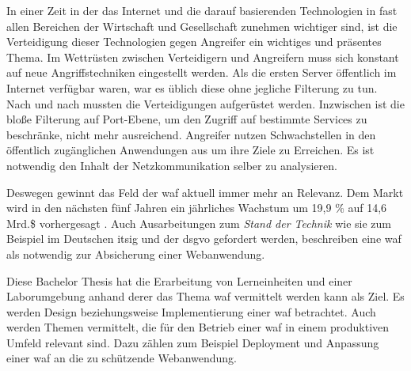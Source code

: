 \label{sec:introuduction}

In einer Zeit in der das Internet und die darauf basierenden Technologien in fast allen Bereichen der Wirtschaft und Gesellschaft zunehmen wichtiger sind, ist die Verteidigung dieser Technologien gegen Angreifer ein wichtiges und präsentes Thema.
Im Wettrüsten zwischen Verteidigern und Angreifern muss sich konstant auf neue Angriffstechniken eingestellt werden.
Als die ersten Server öffentlich im Internet verfügbar waren, war es üblich diese ohne jegliche Filterung zu tun.
Nach und nach mussten die Verteidigungen aufgerüstet werden.
Inzwischen ist die bloße Filterung auf Port-Ebene, um den Zugriff auf bestimmte Services zu beschränke, nicht mehr ausreichend.
Angreifer nutzen Schwachstellen in den öffentlich zugänglichen Anwendungen aus um ihre Ziele zu Erreichen.
Es ist notwendig den Inhalt der Netzkommunikation selber zu analysieren.


Deswegen gewinnt das Feld der \ac{waf} aktuell immer mehr an Relevanz.
Dem Markt wird in den nächsten fünf Jahren ein jährliches Wachstum um 19,9 \% auf 14,6 Mrd.\$ vorhergesagt \cite{WebApplicationFirewall}.
Auch Ausarbeitungen zum \textit{Stand der Technik} wie sie zum Beispiel im Deutschen \ac{itsig} und der \ac{dsgvo} gefordert werden, beschreiben eine \ac{waf} als notwendig zur Absicherung einer Webanwendung\cite[3.1.19 Schutz von Webanwendungen]{StandTechnik}.


Diese Bachelor Thesis hat die Erarbeitung von Lerneinheiten und einer Laborumgebung anhand derer das Thema \ac{waf} vermittelt werden kann als Ziel.
Es werden Design beziehungsweise Implementierung einer \ac{waf} betrachtet.
Auch werden Themen vermittelt, die für den Betrieb einer \ac{waf} in einem produktiven Umfeld relevant sind.
Dazu zählen zum Beispiel Deployment und Anpassung einer \ac{waf} an die zu schützende Webanwendung.


\pagebreak